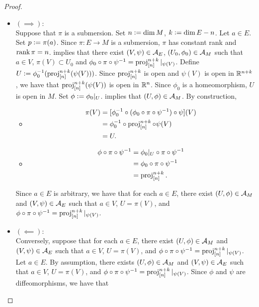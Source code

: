 \documentclass{book}
\begin{document}
	\begin{proof}\
		\begin{itemize}
			\item $(\implies):$ \\
			Suppose that $\pi$ is a submersion. Set $n \vcentcolon= \dim M$, $k \vcentcolon= \dim E - n$. Let $a \in E$. Set $p \vcentcolon= \pi(a)$. Since $\pi:E \rightarrow M$ is a submersion, $\pi$ has constant rank and $\operatorname{\text{rank}} \pi = n$.  implies that there exist $(V, \psi) \in \mathcal{A}_E$, $(U_0, \phi_0) \in \mathcal{A}_M$ such that $a \in V$, $\pi(V) \subset U_0$ and $\phi_0 \circ \pi \circ \psi^{-1} = \operatorname{\text{proj}}^{n+k}_{[n]}|_{\psi(V)}$. Define $U \vcentcolon= \phi_0^{-1}(\operatorname{\text{proj}}^{n+k}_{[n]}(\psi(V)))$. Since $\operatorname{\text{proj}}^{n+k}_{[n]}$ is open and $\psi(V)$ is open in $\mathbb{R}^{n+k}$, we have that $\operatorname{\text{proj}}^{n+k}_{[n]}(\psi(V))$ is open in $\mathbb{R}^n$. Since $\phi_0$ is a homeomorphism, $U$ is open in $M$. Set $\phi \vcentcolon= \phi_0|_U$.  implies that $(U, \phi) \in \mathcal{A}_M$. By construction, 
			\begin{itemize}
				\item 
				\begin{align*}
					\pi(V)
					& = [\phi_0^{-1} \circ ( \phi_0 \circ \pi \circ \psi^{-1}) \circ \psi] (V) \\
					& = \phi_0^{-1} \circ \operatorname{\text{proj}}^{n+k}_{[n]} \circ \psi (V) \\
					& = U.
				\end{align*}
				\item 
				\begin{align*}
					\phi \circ \pi \circ \psi^{-1} 
					& = \phi_0|_U \circ \pi \circ \psi^{-1} \\
					& =  \phi_0 \circ \pi \circ \psi^{-1} \\
					& = \operatorname{\text{proj}}^{n+k}_{[n]}.
				\end{align*}
			\end{itemize}
			Since $a \in E$ is arbitrary, we have that for each $a \in E$, there exist $(U, \phi) \in \mathcal{A}_M$ and $(V, \psi) \in \mathcal{A}_E$ such that $a \in V$, $U = \pi(V)$, and $\phi \circ \pi \circ \psi^{-1} = \operatorname{\text{proj}}^{n+k}_{[n]}|_{\psi(V)}$.
			\item $(\impliedby):$ \\ 
			Conversely, suppose that for each $a \in E$, there exist $(U, \phi) \in \mathcal{A}_M$ and $(V, \psi) \in \mathcal{A}_E$ such that $a \in V$, $U = \pi(V)$, and $\phi \circ \pi \circ \psi^{-1} = \operatorname{\text{proj}}^{n+k}_{[n]}|_{\psi(V)}$. Let $a \in E$. By assumption, there exists $(U, \phi) \in \mathcal{A}_M$ and $(V, \psi) \in \mathcal{A}_E$ such that $a \in V$, $U = \pi(V)$, and $\phi \circ \pi \circ \psi^{-1} = \operatorname{\text{proj}}^{n+k}_{[n]}|_{\psi(V)}$. Since $\phi$ and $\psi$ are diffeomorphisms, we have that 

\end{itemize}
\end{proof}
\end{document}
